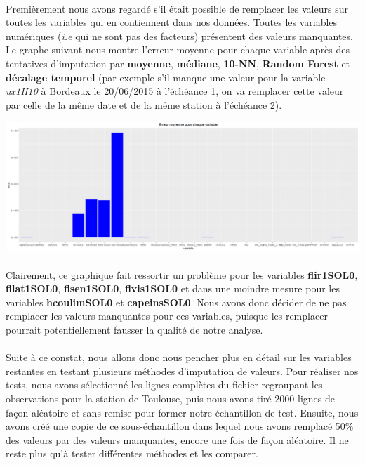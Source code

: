 \documentclass[14pt, openany]{article}
\begin{document}
\paragraph{}
Premièrement nous avons regardé s'il était possible de remplacer les valeurs sur toutes les variables qui en contiennent dans nos données. Toutes les variables numériques (\textit{i.e} qui ne sont pas des facteurs) présentent des valeurs manquantes. Le graphe suivant nous montre l'erreur moyenne pour chaque variable après des tentatives d'imputation par \textbf{moyenne}, \textbf{médiane}, \textbf{10-NN}, \textbf{Random Forest} et \textbf{décalage temporel} (par exemple s'il manque une valeur pour la variable \textit{ux1H10} à Bordeaux le 20/06/2015 à l'échéance 1, on va remplacer cette valeur par celle de la même date et de la même station à l'échéance 2).

\includegraphics[width=17cm]{Images/na_error.png}
\begin{center}
\label{fig1}
\end{center}
\paragraph{}
Clairement, ce graphique fait ressortir un problème pour les variables \textbf{flir1SOL0}, \textbf{fllat1SOL0}, \textbf{flsen1SOL0}, \textbf{flvis1SOL0} et dans une moindre mesure pour les variables \textbf{hcoulimSOL0} et \textbf{capeinsSOL0}. Nous avons donc décider de ne pas remplacer les valeurs manquantes pour ces variables, puisque les remplacer pourrait potentiellement fausser la qualité de notre analyse.
\paragraph{}
Suite à ce constat, nous allons donc nous pencher plus en détail sur les variables restantes en testant plusieurs méthodes d'imputation de valeurs. Pour réaliser nos tests, nous avons sélectionné les lignes complètes du fichier regroupant les observations pour la station de Toulouse, puis nous avons tiré 2000 lignes de façon aléatoire et sans remise pour former notre échantillon de test. Ensuite, nous avons créé une copie de ce sous-échantillon dans lequel nous avons remplacé 50\% des valeurs par des valeurs manquantes, encore une fois de façon aléatoire. Il ne reste plus qu'à tester différentes méthodes et les comparer.
\end{document}

